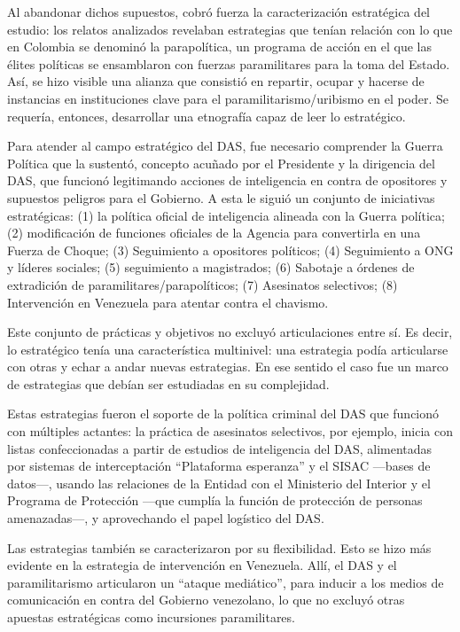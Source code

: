 \documentclass[
  spanish,
  11pt,
  a4paper,
]{scrbook}
\begin{document}
Al abandonar dichos supuestos, cobró fuerza la caracterización
estratégica del estudio: los relatos analizados revelaban estrategias
que tenían relación con lo que en Colombia se denominó la parapolítica,
un programa de acción en el que las élites políticas se ensamblaron con
fuerzas paramilitares para la toma del Estado. Así, se hizo visible una
alianza que consistió en repartir, ocupar y hacerse de instancias en
instituciones clave para el paramilitarismo/uribismo en el poder. Se
requería, entonces, desarrollar una etnografía capaz de leer lo
estratégico.

Para atender al campo estratégico del DAS, fue necesario comprender la
Guerra Política que la sustentó, concepto acuñado por el Presidente y la
dirigencia del DAS, que funcionó legitimando acciones de inteligencia en
contra de opositores y supuestos peligros para el Gobierno. A esta le
siguió un conjunto de iniciativas estratégicas: (1) la política oficial
de inteligencia alineada con la Guerra política; (2) modificación de
funciones oficiales de la Agencia para convertirla en una Fuerza de
Choque; (3) Seguimiento a opositores políticos; (4) Seguimiento a ONG y
líderes sociales; (5) seguimiento a magistrados; (6) Sabotaje a órdenes
de extradición de paramilitares/parapolíticos; (7) Asesinatos
selectivos; (8) Intervención en Venezuela para atentar contra el
chavismo.

Este conjunto de prácticas y objetivos no excluyó articulaciones entre
sí. Es decir, lo estratégico tenía una característica multinivel: una
estrategia podía articularse con otras y echar a andar nuevas
estrategias. En ese sentido el caso fue un marco de estrategias que
debían ser estudiadas en su complejidad.

Estas estrategias fueron el soporte de la política criminal del DAS que
funcionó con múltiples actantes: la práctica de asesinatos selectivos,
por ejemplo, inicia con listas confeccionadas a partir de estudios de
inteligencia del DAS, alimentadas por sistemas de interceptación
``Plataforma esperanza'' y el SISAC ---bases de datos---, usando las
relaciones de la Entidad con el Ministerio del Interior y el Programa de
Protección ---que cumplía la función de protección de personas
amenazadas---, y aprovechando el papel logístico del DAS.

Las estrategias también se caracterizaron por su flexibilidad. Esto se
hizo más evidente en la estrategia de intervención en Venezuela. Allí,
el DAS y el paramilitarismo articularon un ``ataque mediático'', para
inducir a los medios de comunicación en contra del Gobierno venezolano,
lo que no excluyó otras apuestas estratégicas como incursiones
paramilitares.
\end{document}
